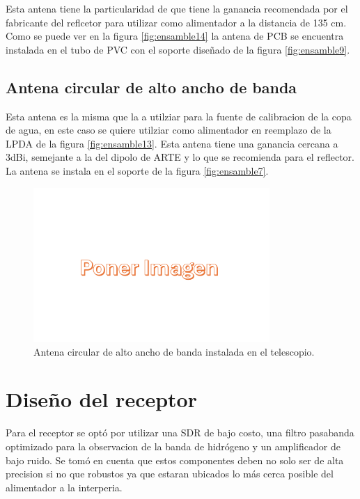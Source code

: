 Esta antena tiene la particularidad de que tiene la ganancia recomendada por el fabricante del reflcetor para utilizar como alimentador a la distancia de 135 cm. Como se puede ver en la figura \ref{fig:ensamble14} la antena de PCB se encuentra instalada en el tubo de PVC con el soporte diseñado de la figura \ref{fig:ensamble9}.\\

\subsection{Antena circular de alto ancho de banda}

Esta antena es la misma que la a utilziar para la fuente de calibracion de la copa de agua, en este caso se quiere utilziar como alimentador en reemplazo de la LPDA de la figura \ref{fig:ensamble13}. Esta antena tiene una ganancia cercana a 3dBi, semejante a la del dipolo de ARTE y lo que se recomienda para el reflector. La antena se instala en el soporte de la figura \ref{fig:ensamble7}.\\

\begin{figure}
    \centering
    \includegraphics[width=0.8\textwidth]{img/imagen}
    \caption{Antena circular de alto ancho de banda instalada en el telescopio.}
    \label{fig:ensamble15}
\end{figure}


\section{Diseño del receptor}

Para el receptor se optó por utilizar una SDR de bajo costo, una filtro pasabanda optimizado para la observacion de la banda de hidrógeno y un amplificador de bajo ruido. Se tomó en cuenta que estos componentes deben no solo ser de alta precision si no que robustos ya que estaran ubicados lo más cerca posible del alimentador a la interperia.\\

